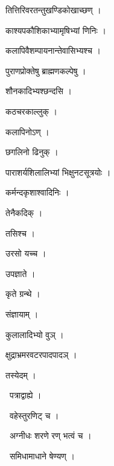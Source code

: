 \documentclass[10pt, openany, oneside]{book}
\begin{document}
\noindent तित्तिरिवरतन्तुखण्डिकोखाच्छण् ।

\noindent काश्यपकौशिकाभ्यामृषिभ्यां णिनिः ।

\noindent कलापिवैशम्पायनान्तेवासिभ्यश्च ।

\noindent पुराणप्रोक्तेषु ब्राह्मणकल्पेषु ।

\noindent शौनकादिभ्यश्छन्दसि ।

\noindent कठचरकाल्लुक् ।

\noindent कलापिनोऽण् ।

\noindent छगलिनो ढिनुक् ।

\noindent पाराशर्यशिलालिभ्यां भिक्षुनटसूत्रयोः ।

\noindent कर्मन्दकृशाश्वादिनिः ।

\noindent तेनैकदिक् ।

\noindent तसिश्च ।

\noindent उरसो यच्च ।

\noindent उपज्ञाते ।

\noindent कृते ग्रन्थे ।

\noindent संज्ञायाम् ।

\noindent कुलालादिभ्यो वुञ् ।

\noindent क्षुद्राभ्रमरवटरपादपादञ् ।

\noindent तस्येदम् ।

\par\noindent\hspace{1.5em}{\vps वा॰}~{\qt पत्राद्वाह्ये ।}

\par\noindent\hspace{1.5em}{\vps वा॰}~{\qt वहेस्तुरणिट् च ।}

\par\noindent\hspace{1.5em}{\vps वा॰}~{\qt अग्नीधः शरणे रण् भत्वं च ।}

\par\noindent\hspace{1.5em}{\vps वा॰}~{\qt समिधामाधाने षेण्यण् ।}
\end{document}
